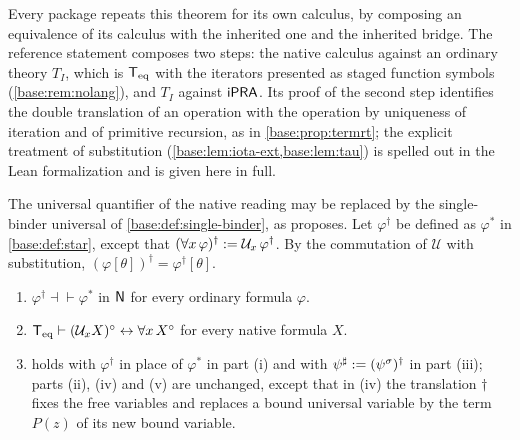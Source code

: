 \begin{remark}
\label{base:rem:bridgepackages}
Every package repeats this theorem for its own calculus, by composing an
equivalence of its calculus with the inherited one and the inherited bridge.
The reference statement composes two steps: the native calculus against an
ordinary theory $T_I$, which is $\mathsf{T}_{\mathrm{eq}}$ with the iterators presented as staged
function symbols (\cref{base:rem:nolang}), and $T_I$ against $\mathsf{iPRA}$.  Its
proof of the second step identifies the double translation of an operation
with the operation by uniqueness of iteration and of primitive recursion,
as in \cref{base:prop:termrt}; the explicit treatment of substitution
(\cref{base:lem:iota-ext,base:lem:tau}) is spelled out in the Lean
formalization and is given here in full.
\end{remark}

The universal quantifier of the native reading may be replaced by the
single-binder universal of \cref{base:def:single-binder}, as
 proposes.  Let $\varphi^{\dagger}$ be defined as
$\varphi^{*}$ in \cref{base:def:star}, except that
$(\forall x\,\varphi)^{\dagger}\mathrel{:=}\mathcal U_x\,\varphi^{\dagger}$.  By
the commutation of $\mathcal U$ with substitution,
$(\varphi[\theta])^{\dagger}=\varphi^{\dagger}[\theta]$.

\begin{corollary}
\label{base:cor:single-binder-bridge}
\begin{enumerate}[label=\textup{(\roman*)}]
\item $\varphi^{\dagger}\dashv\vdash\varphi^{*}$ in $\mathsf{N}$ for every
 ordinary formula $\varphi$.
\item $\mathsf{T}_{\mathrm{eq}}\vdash(\mathcal U_xX)^\circ\leftrightarrow\forall x\,X^\circ$ for
 every native formula $X$.
\item {} holds with $\varphi^{\dagger}$ in place of
 $\varphi^{*}$ in part (i) and with $\psi^{\sharp}\mathrel{:=}(\psi^{\sigma})^{\dagger}$
 in part (iii); parts (ii), (iv) and (v) are unchanged, except that in (iv)
 the translation $\dagger$ fixes the free variables and replaces a bound
 universal variable by the term $P(z)$ of its new bound variable.
\end{enumerate}
\end{corollary}

